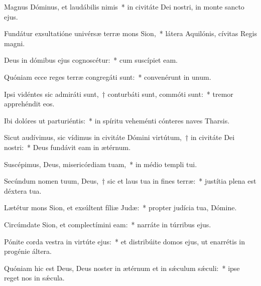 \item Magnus Dóminus, et laudábilis nimis~* in civitáte Dei nostri, in monte sancto ejus.

\item Fundátur exsultatióne univérsæ terræ mons Sion,~* látera Aquilónis, cívitas Regis magni.

\item Deus in dómibus ejus cognoscétur:~* cum suscípiet eam.

\item Quóniam ecce reges terræ congregáti sunt:~* convenérunt in unum.

\item Ipsi vidéntes sic admiráti sunt,~† conturbáti sunt, commóti sunt:~* tremor apprehéndit eos.

\item Ibi dolóres ut parturiéntis:~* in spíritu veheménti cónteres naves Tharsis.

\item Sicut audívimus, sic vídimus in civitáte Dómini virtútum,~† in civitáte Dei nostri:~* Deus fundávit eam in ætérnum.

\item Suscépimus, Deus, misericórdiam tuam,~* in médio templi tui.

\item Secúndum nomen tuum, Deus,~† sic et laus tua in fines terræ:~* justítia plena est déxtera tua.

\item Lætétur mons Sion, et exsúltent fíliæ Judæ:~* propter judícia tua, Dómine.

\item Circúmdate Sion, et complectímini eam:~* narráte in túrribus ejus.

\item Pónite corda vestra in virtúte ejus:~* et distribúite domos ejus, ut enarrétis in progénie áltera.

\item Quóniam hic est Deus, Deus noster in ætérnum et in sǽculum sǽculi:~* ipse reget nos in sǽcula.
